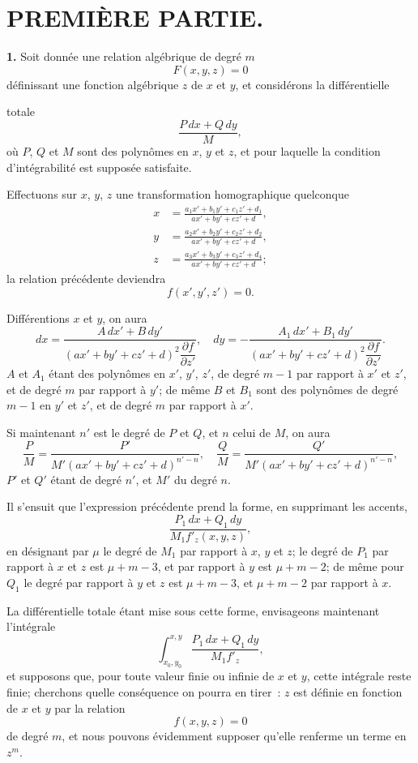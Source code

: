 \documentclass{article}
\begin{document}
\section*{PREMIÈRE PARTIE.}

\textbf{1.} Soit donnée une relation algébrique de degré $m$
\[
F(x, y, z) = 0
\]
définissant une fonction algébrique $z$ de $x$ et $y$, et considérons la différentielle


totale
\[
\frac{P\,dx + Q\,dy}{M},
\]
où $P$, $Q$ et $M$ sont des polynômes en $x$, $y$ et $z$, et pour laquelle la condition d'intégrabilité est supposée satisfaite.

Effectuons sur $x$, $y$, $z$ une transformation homographique quelconque
\[
\begin{aligned}
x &= \frac{a_{1}x' + b_{1}y' + c_{1}z' + d_{1}}{ax' + by' + cz' + d},\\
y &= \frac{a_{2}x' + b_{2}y' + c_{2}z' + d_{2}}{ax' + by' + cz' + d},\\
z &= \frac{a_{3}x' + b_{3}y' + c_{3}z' + d_{4}}{ax' + by' + cz' + d};
\end{aligned}
\]
la relation précédente deviendra
\[
f(x', y', z') = 0.
\]

Différentions $x$ et $y$, on aura
\[
dx = \frac{A\,dx' + B\,dy'}{(ax' + by' + cz' + d)^{2}\dfrac{\partial f}{\partial z'}}, \quad
dy = -\frac{A_{1}\,dx' + B_{1}\,dy'}{(ax' + by' + cz' + d)^{2}\dfrac{\partial f}{\partial z'}}.
\]
$A$ et $A_{1}$ étant des polynômes en $x'$, $y'$, $z'$, de degré $m - 1$ par rapport à $x'$ et $z'$, et de degré $m$ par rapport à $y'$; de même $B$ et $B_{1}$ sont des polynômes de degré $m - 1$ en $y'$ et $z'$, et de degré $m$ par rapport à $x'$.

Si maintenant $n'$ est le degré de $P$ et $Q$, et $n$ celui de $M$, on aura
\[
\frac{P}{M} = \frac{P'}{M'(ax' + by' + cz' + d)^{n'-n}}, \quad
\frac{Q}{M} = \frac{Q'}{M'(ax' + by' + cz' + d)^{n'-n}},
\]
$P'$ et $Q'$ étant de degré $n'$, et $M'$ du degré $n$.

Il s'ensuit que l'expression précédente prend la forme, en supprimant les accents,
\[
\frac{P_{1}\,dx + Q_{1}\,dy}{M_{1}f'_{z}(x, y, z)},
\]
en désignant par $\mu$ le degré de $M_{1}$ par rapport à $x$, $y$ et $z$; le degré
de $P_{1}$ par rapport à $x$ et $z$ est $\mu + m - 3$, et par rapport à $y$ est $\mu + m - 2$; de même pour $Q_{1}$ le degré par rapport à $y$ et $z$ est $\mu + m - 3$, et $\mu + m - 2$ par rapport à $x$.

La différentielle totale étant mise sous cette forme, envisageons maintenant l'intégrale
\[
\int_{x_{0}, y_{0}}^{x, y} \frac{P_{1}\,dx + Q_{1}\,dy}{M_{1}f'_{z}},
\]
et supposons que, pour toute valeur finie ou infinie de $x$ et $y$, cette intégrale reste finie; cherchons quelle conséquence on pourra en tirer~: $z$ est définie en fonction de $x$ et $y$ par la relation
\[
f(x, y, z) = 0
\]
de degré $m$, et nous pouvons évidemment supposer qu'elle renferme un terme en $z^{m}$.
\end{document}
